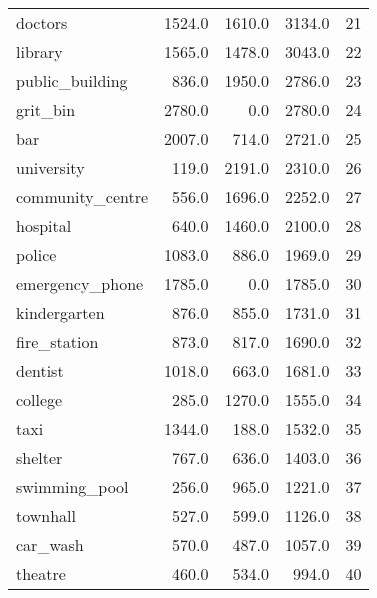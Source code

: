 \begin{tabular}{lrrrr}
doctors          &       1524.0 &         1610.0 &       3134.0 &    21 \\
library          &       1565.0 &         1478.0 &       3043.0 &    22 \\
public\_building  &        836.0 &         1950.0 &       2786.0 &    23 \\
grit\_bin         &       2780.0 &            0.0 &       2780.0 &    24 \\
bar              &       2007.0 &          714.0 &       2721.0 &    25 \\
university       &        119.0 &         2191.0 &       2310.0 &    26 \\
community\_centre &        556.0 &         1696.0 &       2252.0 &    27 \\
hospital         &        640.0 &         1460.0 &       2100.0 &    28 \\
police           &       1083.0 &          886.0 &       1969.0 &    29 \\
emergency\_phone  &       1785.0 &            0.0 &       1785.0 &    30 \\
kindergarten     &        876.0 &          855.0 &       1731.0 &    31 \\
fire\_station     &        873.0 &          817.0 &       1690.0 &    32 \\
dentist          &       1018.0 &          663.0 &       1681.0 &    33 \\
college          &        285.0 &         1270.0 &       1555.0 &    34 \\
taxi             &       1344.0 &          188.0 &       1532.0 &    35 \\
shelter          &        767.0 &          636.0 &       1403.0 &    36 \\
swimming\_pool    &        256.0 &          965.0 &       1221.0 &    37 \\
townhall         &        527.0 &          599.0 &       1126.0 &    38 \\
car\_wash         &        570.0 &          487.0 &       1057.0 &    39 \\
theatre          &        460.0 &          534.0 &        994.0 &    40 \\
\bottomrule
\end{tabular}
